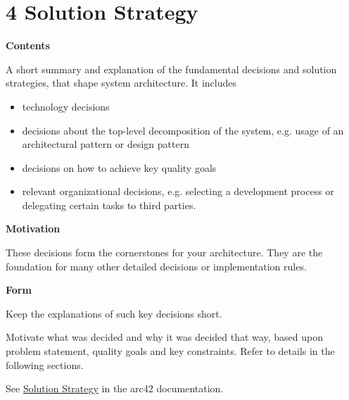 \hypertarget{section-solution-strategy}{%
\section{4 Solution Strategy}\label{section-solution-strategy}}

\textbf{Contents}

A short summary and explanation of the fundamental decisions and
solution strategies, that shape system architecture. It includes

\begin{itemize}
\item
  technology decisions
\item
  decisions about the top-level decomposition of the system, e.g. usage
  of an architectural pattern or design pattern
\item
  decisions on how to achieve key quality goals
\item
  relevant organizational decisions, e.g. selecting a development
  process or delegating certain tasks to third parties.
\end{itemize}

\textbf{Motivation}

These decisions form the cornerstones for your architecture. They are
the foundation for many other detailed decisions or implementation
rules.

\textbf{Form}

Keep the explanations of such key decisions short.

Motivate what was decided and why it was decided that way, based upon
problem statement, quality goals and key constraints. Refer to details
in the following sections.

See \href{https://docs.arc42.org/section-4/}{Solution Strategy} in the
arc42 documentation.
